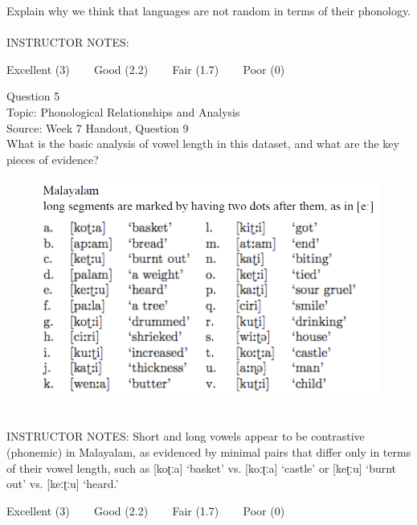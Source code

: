 \documentclass[12pt]{article}
\begin{document}
Explain why we think that languages are not random in terms of their phonology.\\


~\\
INSTRUCTOR NOTES: 


\vfill
Excellent (3) ~~~ Good (2.2) ~~~ Fair (1.7) ~~~ Poor (0)
\newpage

{\large Question 5}\\

Topic: Phonological Relationships and Analysis\\
Source: Week 7 Handout, Question 9\\

What is the basic analysis of vowel length in this dataset, and what are the key pieces of evidence?\\

\begin{figure}[H]
\includegraphics{../images/malayalam.png}
\end{figure}

~\\
INSTRUCTOR NOTES: Short and long vowels appear to be contrastive (phonemic) in Malayalam, as evidenced by minimal pairs that differ only in terms of their vowel length, such as [koʈːa] ‘basket’ vs. [koːʈːa] ‘castle’ or [keʈːu] ‘burnt out’ vs. [keːʈːu] ‘heard.’


\vfill
Excellent (3) ~~~ Good (2.2) ~~~ Fair (1.7) ~~~ Poor (0)
\newpage

\begin{center}
\textbf{{\color{red}{\HUGE END OF EXAM}}}\\

\end{center}
\newpage
\end{document}
